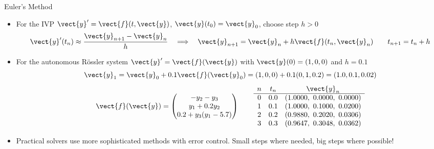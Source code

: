 \begin{frame}{Euler's Method}
\begin{itemize}
  \item For the IVP $\vect{y}'=\vect{f}(t,\vect{y})$,
  $\vect{y}(t_0)=\vect{y}_0$, choose step $h>0$
  \[
    \vect{y}'(t_n)\approx\frac{\vect{y}_{n+1}-\vect{y}_n}{h}
    \quad\Longrightarrow\quad
    \vect{y}_{n+1}=\vect{y}_n+h\vect{f}(t_n,\vect{y}_n)
    \qquad t_{n+1}=t_n+h
  \]
  \item For the autonomous R\"ossler system $\vect{y}'=\vect{f}(\vect{y})$ with $\vect{y}(0)=(1,0,0)$ and $h=0.1$
  \[
    \vect{y}_1=\vect{y}_0+0.1\vect{f}(\vect{y}_0)
    =(1,0,0)+0.1(0,1,0.2)=(1.0,0.1,0.02)
  \]
  \[
    \vect{f}(\vect{y})=
    \begin{pmatrix}
      -y_2-y_3\\
      y_1+0.2y_2\\
      0.2+y_3(y_1-5.7)
    \end{pmatrix}
    \qquad
    \begin{array}{ccl}
      n&t_n&\multicolumn{1}{c}{\vect{y}_n}\\ \hline
      0&0.0&(1.0000,\ 0.0000,\ 0.0000)\\
      1&0.1&(1.0000,\ 0.1000,\ 0.0200)\\
      2&0.2&(0.9880,\ 0.2020,\ 0.0306)\\
      3&0.3&(0.9647,\ 0.3048,\ 0.0362)
    \end{array}
  \]
  \item Practical solvers use more sophisticated methods with error control. Small steps where needed, big steps where possible! 
\end{itemize}
\end{frame}
